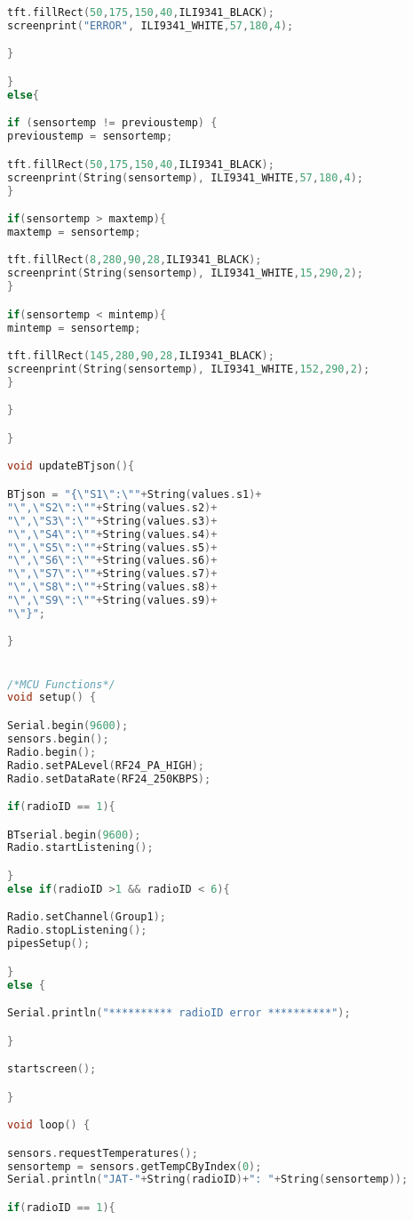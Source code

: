 \begin{lstlisting}[language=C++, caption={Firmware de nuestro prototipo en su versión 1.0}, captionpos=b, basicstyle=\small]
tft.fillRect(50,175,150,40,ILI9341_BLACK);
screenprint("ERROR", ILI9341_WHITE,57,180,4);

}

}
else{

if (sensortemp != previoustemp) {
previoustemp = sensortemp;

tft.fillRect(50,175,150,40,ILI9341_BLACK);
screenprint(String(sensortemp), ILI9341_WHITE,57,180,4);
}

if(sensortemp > maxtemp){
maxtemp = sensortemp;

tft.fillRect(8,280,90,28,ILI9341_BLACK);
screenprint(String(sensortemp), ILI9341_WHITE,15,290,2);
}

if(sensortemp < mintemp){
mintemp = sensortemp;

tft.fillRect(145,280,90,28,ILI9341_BLACK);
screenprint(String(sensortemp), ILI9341_WHITE,152,290,2);
}

}

}

void updateBTjson(){

BTjson = "{\"S1\":\""+String(values.s1)+
"\",\"S2\":\""+String(values.s2)+
"\",\"S3\":\""+String(values.s3)+
"\",\"S4\":\""+String(values.s4)+
"\",\"S5\":\""+String(values.s5)+
"\",\"S6\":\""+String(values.s6)+
"\",\"S7\":\""+String(values.s7)+
"\",\"S8\":\""+String(values.s8)+
"\",\"S9\":\""+String(values.s9)+
"\"}";

}


/*MCU Functions*/
void setup() {

Serial.begin(9600);
sensors.begin();
Radio.begin();
Radio.setPALevel(RF24_PA_HIGH);
Radio.setDataRate(RF24_250KBPS);

if(radioID == 1){

BTserial.begin(9600);
Radio.startListening();

}
else if(radioID >1 && radioID < 6){

Radio.setChannel(Group1);
Radio.stopListening();
pipesSetup();

}
else {

Serial.println("********** radioID error **********");

}

startscreen();

}

void loop() {

sensors.requestTemperatures();
sensortemp = sensors.getTempCByIndex(0);
Serial.println("JAT-"+String(radioID)+": "+String(sensortemp));

if(radioID == 1){


\end{lstlisting}

